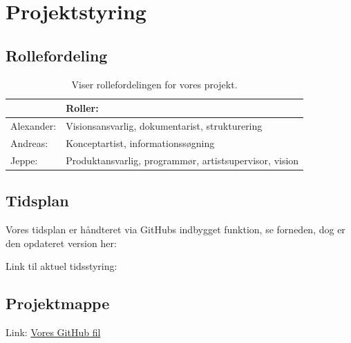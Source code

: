 \section{Projektstyring}
\subsection{Rollefordeling}
\begin{table}[H]
  \centering
\begin{tabular}{l|l}
           & Roller:                                                \\ \hline
Alexander: & Visionsansvarlig, dokumentarist, strukturering         \\ \hline
Andreas:   & Konceptartist, informationssøgning                     \\ \hline
Jeppe:     & Produktansvarlig, programmør, artistsupervisor, vision
\end{tabular}
\caption{Viser rollefordelingen for vores projekt.}
\end{table}
\subsection{Tidsplan}
Vores tidsplan er håndteret via GitHubs indbygget funktion, se forneden, dog er den opdateret version her:
\begin{figure}[H]
  \centering
\end{figure}

Link til aktuel tidsstyring:
\subsection{Projektmappe}
Link: \href{https://github.com/ZBC-Slagelse-HTX-X/teknologiprojekt-1---Krisen-kradser/tree/main}{Vores GitHub fil}

